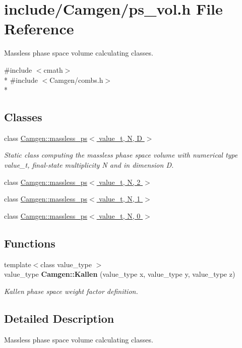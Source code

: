 \hypertarget{a00746}{}\section{include/\+Camgen/ps\+\_\+vol.h File Reference}
\label{a00746}


Massless phase space volume calculating classes.  


{\ttfamily \#include $<$cmath$>$}\\*
{\ttfamily \#include $<$Camgen/combs.\+h$>$}\\*
\subsection*{Classes}
\begin{DoxyCompactItemize}
\item 
class \hyperlink{a00355}{Camgen\+::massless\+\_\+ps$<$ value\+\_\+t, N, D $>$}
\begin{DoxyCompactList}\small\item\em Static class computing the massless phase space volume with numerical type value\+\_\+t, final-\/state multiplicity N and in dimension D. \end{DoxyCompactList}\item 
class \hyperlink{a00358}{Camgen\+::massless\+\_\+ps$<$ value\+\_\+t, N, 2 $>$}
\item 
class \hyperlink{a00357}{Camgen\+::massless\+\_\+ps$<$ value\+\_\+t, N, 1 $>$}
\item 
class \hyperlink{a00356}{Camgen\+::massless\+\_\+ps$<$ value\+\_\+t, N, 0 $>$}
\end{DoxyCompactItemize}
\subsection*{Functions}
\begin{DoxyCompactItemize}
\item 
\hypertarget{a00878_a067e586370404de9b7892c4533092def}{}{\footnotesize template$<$class value\+\_\+type $>$ }\\value\+\_\+type {\bfseries Camgen\+::\+Kallen} (value\+\_\+type x, value\+\_\+type y, value\+\_\+type z)\label{a00878_a067e586370404de9b7892c4533092def}

\begin{DoxyCompactList}\small\item\em Kallen phase space weight factor definition. \end{DoxyCompactList}\end{DoxyCompactItemize}


\subsection{Detailed Description}
Massless phase space volume calculating classes. 

